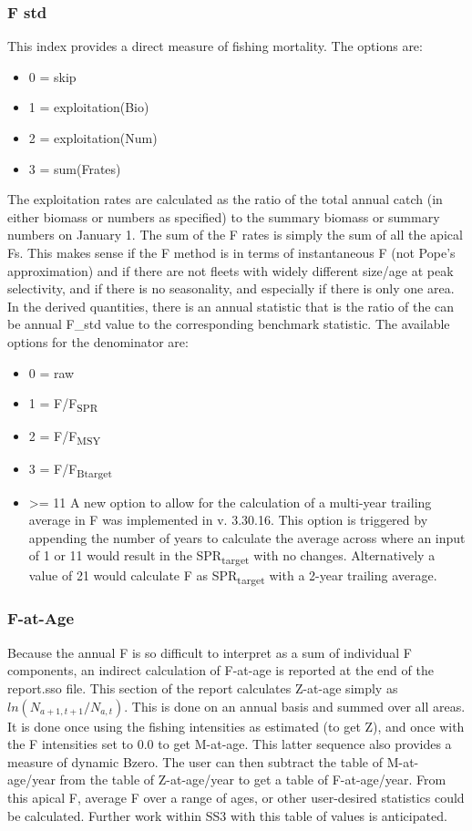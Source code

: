 \subsubsection{F std}
This index provides a direct measure of fishing mortality.  The options are:
\begin{itemize}
	\item 0 = skip
	\item 1 = exploitation(Bio)
	\item 2 = exploitation(Num)
	\item 3 = sum(Frates)
\end{itemize}
The exploitation rates are calculated as the ratio of the total annual catch (in either biomass or numbers as specified) to the summary biomass or summary numbers on January 1.  The sum of the F rates is simply the sum of all the apical Fs.  This makes sense if the F method is in terms of instantaneous F (not Pope's approximation) and if there are not fleets with widely different size/age at peak selectivity, and if there is no seasonality, and especially if there is only one area.  In the derived quantities, there is an annual statistic that is the ratio of the can be annual F\_std value to the corresponding benchmark statistic.  The available options for the denominator are:
\begin{itemize}
	\item 0 = raw
	\item 1 = F/F\textsubscript {SPR}
	\item 2 = F/F\textsubscript {MSY}
	\item 3 = F/F\textsubscript {Btarget}
	\item >= 11  A new option to allow for the calculation of a multi-year trailing average in F was implemented in v. 3.30.16. This option is triggered by appending the number of years to calculate the average across where an input of 1 or 11 would result in the SPR\textsubscript{target} with no changes.  Alternatively a value of 21 would calculate F as SPR\textsubscript{target} with a 2-year trailing average.
\end{itemize}

\subsubsection{F-at-Age}
Because the annual F is so difficult to interpret as a sum of individual F components, an indirect calculation of F-at-age is reported at the end of the report.sso file. This section of the report calculates Z-at-age simply as $ln(N_{a+1,t+1}/N_{a,t})$. This is done on an annual basis and summed over all areas. It is done once using the fishing intensities as estimated (to get Z), and once with the F intensities set to 0.0 to get M-at-age. This latter sequence also provides a measure of dynamic Bzero.  The user can then subtract the table of M-at-age/year from the table of Z-at-age/year to get a table of F-at-age/year. From this apical F, average F over a range of ages, or other user-desired statistics could be calculated.  Further work within SS3 with this table of values is anticipated.


